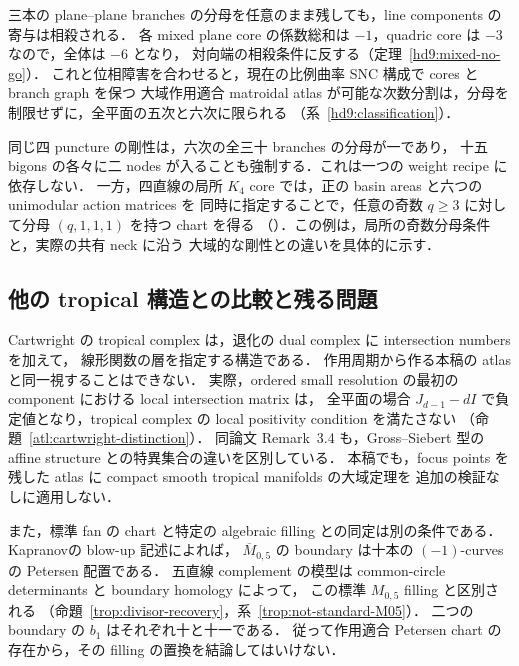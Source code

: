 三本の plane--plane branches の分母を任意のまま残しても，line components の寄与は相殺される．
各 mixed plane core の係数総和は $-1$，quadric core は $-3$ なので，全体は $-6$ となり，
対向端の相殺条件に反する（定理~\ref{hd9:mixed-no-go}）．
これと位相障害を合わせると，現在の比例曲率 SNC 構成で cores と branch graph を保つ
大域作用適合 matroidal atlas が可能な次数分割は，分母を制限せずに，全平面の五次と六次に限られる
（系~\ref{hd9:classification}）．

同じ四 puncture の剛性は，六次の全三十 branches の分母が一であり，
十五 bigons の各々に二 nodes が入ることも強制する．これは一つの weight recipe に依存しない．
一方，四直線の局所 $K_4$ core では，正の basin areas と六つの unimodular action matrices を
同時に指定することで，任意の奇数 $q\ge3$ に対して分母 $(q,1,1,1)$ を持つ chart を得る
（\cite{QuinticArithmetic}）．この例は，局所の奇数分母条件と，実際の共有 neck に沿う
大域的な剛性との違いを具体的に示す．

\subsection{他の tropical 構造との比較と残る問題}

Cartwright の tropical complex は，退化の dual complex に intersection numbers を加えて，
線形関数の層を指定する構造である\cite[Definitions~2.5, 2.8; Construction~3.2]{CartwrightComplexes}．
作用周期から作る本稿の atlas と同一視することはできない．
実際，ordered small resolution の最初の component における local intersection matrix は，
全平面の場合 $J_{d-1}-dI$ で負定値となり，tropical complex の local positivity condition を満たさない
（命題~\ref{atl:cartwright-distinction}）．
同論文 Remark~3.4 も，Gross--Siebert 型の affine structure との特異集合の違いを区別している．
本稿でも，focus points を残した atlas に compact smooth tropical manifolds の大域定理を
追加の検証なしに適用しない．

また，標準 fan の chart と特定の algebraic filling との同定は別の条件である．
Kapranov\cite[Theorem~4.3.3]{KapranovChow}の blow-up 記述によれば，
$\overline M_{0,5}$ の boundary は十本の $(-1)$-curves の Petersen 配置である．
五直線 complement の模型は common-circle determinants と boundary homology によって，
この標準 $M_{0,5}$ filling と区別される
（命題~\ref{trop:divisor-recovery}，系~\ref{trop:not-standard-M05}）．
二つの boundary の $b_1$ はそれぞれ十と十一である．
従って作用適合 Petersen chart の存在から，その filling の置換を結論してはいけない．

